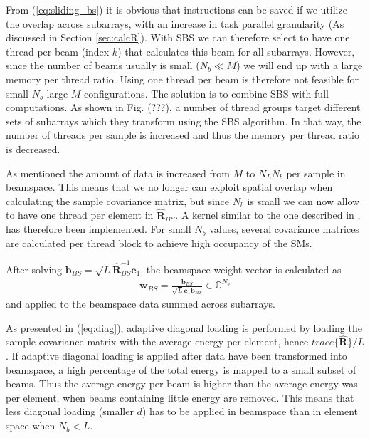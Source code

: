 \documentclass[12pt,journal,onecolumn]{IEEEtran}
\newcommand{\mat}[1]{\mathbf{#1}}
\renewcommand{\vec}[1]{\mathbf{#1}}
\begin{document}
From (\ref{eq:sliding_bs}) it is obvious that instructions can be saved if we utilize the overlap across subarrays, with an increase in task parallel granularity (As discussed in Section \ref{sec:calcR}). With SBS we can therefore select to have one thread per beam (index $k$) that calculates this beam for all subarrays. However, since the number of beams usually is small ($N_b \ll M$) we will end up with a large memory per thread ratio. Using one thread per beam is therefore not feasible for small $N_b$ large $M$ configurations. The solution is to combine SBS with full computations. As shown in Fig. (???), a number of thread groups target different sets of subarrays which they transform using the SBS algorithm. In that way, the number of threads per sample is increased and thus the memory per thread ratio is decreased. 

As mentioned the amount of data is increased from $M$ to $N_LN_b$ per sample in beamspace. This means that we no longer can exploit spatial overlap when calculating the sample covariance matrix, but since $N_b$ is small we can now allow to have one thread per element in $\mat{\hat{R}}_{BS}$. A kernel similar to the one described in \cite{Chen2011}, has therefore been implemented. For small $N_b$ values, several covariance matrices are calculated per thread block to achieve high occupancy of the SMs.

After solving $\vec{b}_{BS} = \sqrt{L}\mat{\hat{R}}_{BS}^{-1}\vec{e}_1$, the beamspace weight vector is calculated as 
\begin{align}
\vec{w}_{BS} = \frac{\vec{b}_{BS}}{\sqrt{L}\vec{e}_1\vec{b}_{BS}} \in \mathbb{C}^{N_b}
\end{align}  
and applied to the beamspace data summed across subarrays.


As presented in (\ref{eq:diag}), adaptive diagonal loading is performed by loading the sample covariance matrix with the average energy per element, hence $trace\{\mat{\hat{R}}\}/L$. If adaptive diagonal loading is applied after data have been transformed into beamspace, a high percentage of the total energy is mapped to a small subset of beams. Thus the average energy per beam is higher than the average energy was per element, when beams containing little energy are removed. This means that less diagonal loading (smaller $d$) has to be applied in beamspace than in element space when $N_b < L$.
\end{document}

